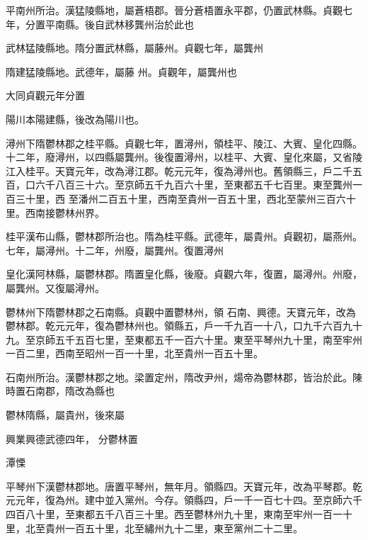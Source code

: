 \begin{pinyinscope}
 平南州所治。漢猛陵縣地，屬蒼梧郡。晉分蒼梧置永平郡，仍置武林縣。貞觀七年，分置平南縣。後自武林移龔州治於此也



 武林猛陵縣地。隋分置武林縣，屬藤州。貞觀七年，屬龔州



 隋建猛陵縣地。武德年，屬藤
 州。貞觀年，屬龔州也



 大同貞觀元年分置



 陽川本陽建縣，後改為陽川也。



 潯州下隋鬱林郡之桂平縣。貞觀七年，置潯州，領桂平、陵江、大賓、皇化四縣。十二年，廢潯州，以四縣屬龔州。後復置潯州，以桂平、大賓、皇化來屬，又省陵江入桂平。天寶元年，改為潯江郡。乾元元年，復為潯州也。舊領縣三，戶二千五百，口六千八百三十六。至京師五千九百六十里，至東都五千七百里。東至龔州一百三十里，西
 至潘州二百五十里，西南至貴州一百五十里，西北至蒙州三百六十里。西南接鬱林州界。



 桂平漢布山縣，鬱林郡所治也。隋為桂平縣。武德年，屬貴州。貞觀初，屬燕州。七年，屬潯州。十二年，州廢，屬龔州。復置潯州



 皇化漢阿林縣，屬鬱林郡。隋置皇化縣，後廢。貞觀六年，復置，屬潯州。州廢，屬龔州。又復屬潯州。



 鬱林州下隋鬱林郡之石南縣。貞觀中置鬱林州，領
 石南、興德。天寶元年，改為鬱林郡。乾元元年，復為鬱林州也。領縣五，戶一千九百一十八，口九千六百九十九。至京師五千五百七里，至東都五千一百六十里。東至平琴州九十里，南至牢州一百二里，西南至昭州一百一十里，北至貴州一百五十里。



 石南州所治。漢鬱林郡之地。梁置定州，隋改尹州，煬帝為鬱林郡，皆治於此。陳時置石南郡，隋改為縣也



 鬱林隋縣，屬貴州，後來屬



 興業興德武德四年，
 分鬱林置



 潭慄



 平琴州下漢鬱林郡地。唐置平琴州，無年月。領縣四。天寶元年，改為平琴郡。乾元元年，復為州。建中並入黨州。今存。領縣四，戶一千一百七十四。至京師六千四百八十里，至東都五千八百三十里。西至鬱林州九十里，東南至牢州一百一十里，北至貴州一百五十里，北至繡州九十二里，東至黨州二十二里。




\end{pinyinscope}
